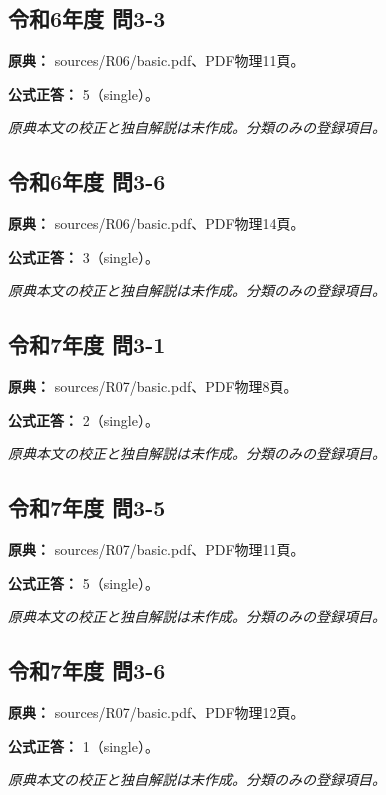 \subsection{令和6年度 問3-3}
\label{q:r06-reg-basic-3-3}

\noindent\textbf{原典：} sources/R06/basic.pdf、PDF物理11頁。

\textbf{公式正答：} 5（single）。

\par\textit{原典本文の校正と独自解説は未作成。分類のみの登録項目。}

\subsection{令和6年度 問3-6}
\label{q:r06-reg-basic-3-6}

\noindent\textbf{原典：} sources/R06/basic.pdf、PDF物理14頁。

\textbf{公式正答：} 3（single）。

\par\textit{原典本文の校正と独自解説は未作成。分類のみの登録項目。}

\subsection{令和7年度 問3-1}
\label{q:r07-reg-basic-3-1}

\noindent\textbf{原典：} sources/R07/basic.pdf、PDF物理8頁。

\textbf{公式正答：} 2（single）。

\par\textit{原典本文の校正と独自解説は未作成。分類のみの登録項目。}

\subsection{令和7年度 問3-5}
\label{q:r07-reg-basic-3-5}

\noindent\textbf{原典：} sources/R07/basic.pdf、PDF物理11頁。

\textbf{公式正答：} 5（single）。

\par\textit{原典本文の校正と独自解説は未作成。分類のみの登録項目。}

\subsection{令和7年度 問3-6}
\label{q:r07-reg-basic-3-6}

\noindent\textbf{原典：} sources/R07/basic.pdf、PDF物理12頁。

\textbf{公式正答：} 1（single）。

\par\textit{原典本文の校正と独自解説は未作成。分類のみの登録項目。}
